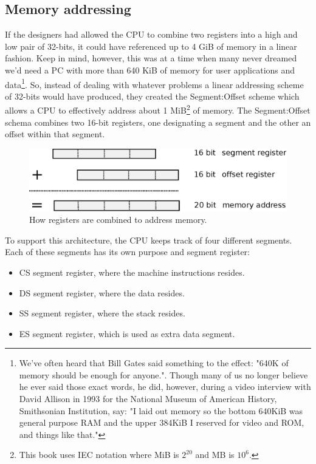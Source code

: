 \documentclass[book.tex]{subfiles}
\begin{document}
\subsection{Memory addressing}
If the designers had allowed the CPU to combine two registers into a high and low pair of 32-bits, it could have referenced up to 4 GiB of memory in a linear fashion. Keep in mind, however, this was at a time when many never dreamed we'd need a PC with more than 640 KiB of memory for user applications and data\footnote{We've often heard that Bill Gates said something to the effect: "640K of memory should be enough for anyone.". Though many of us no longer believe he ever said those exact words, he did, however, during a video interview with David Allison in 1993 for the National Museum of American History, Smithsonian Institution, say: "I laid out memory so the bottom 640KiB was general purpose RAM and the upper 384KiB I reserved for video and ROM, and things like that."}. So, instead of dealing with whatever problems a linear addressing scheme of 32-bits would have produced, they created the Segment:Offset scheme 
which allows a CPU to effectively address about 1 MiB\footnote{This book uses IEC notation where MiB is $2^{20}$ and MB is $10^6$.} of memory. The Segment:Offset schema combines two 16-bit registers, one designating a segment and the other an offset within that segment.
\\

\par
\begin{figure}[H]
\centering
\includegraphics[width=\textwidth]{imgs/drawings/register_combination_20_bits_address.eps}
\caption{How registers are combined to address memory.}
\label{fig:register_comb_to_20_bits}
\end{figure}
\par

To support this architecture, the CPU keeps track of four different segments. Each of these segments has its own purpose and segment register:
\begin{itemize}
  \item CS segment register, where the machine instructions resides.
  \item DS segment register, where the data resides.
  \item SS segment register, where the stack resides.
  \item ES segment register, which is used as extra data segment.
\end{itemize}
\end{document}
